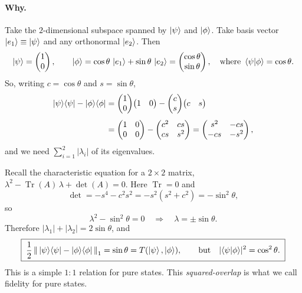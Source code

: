 \documentclass[11pt]{article}
\newcommand{\Tr}{\operatorname{Tr}}
\newcommand{\onenorm}[1]{\left\lVert #1 \right\rVert_{1}}
\begin{document}
\paragraph{Why.}
Take the $2$-dimensional subspace spanned by $\ket{\psi}$ and $\ket{\phi}$.
Take basis vector $\ket{e_1}\equiv\ket{\psi}$ and any orthonormal $\ket{e_2}$.
Then
\[
\ket{\psi} = \begin{pmatrix}1\\0\end{pmatrix},
\qquad
\ket{\phi} = \cos\theta\,\ket{e_1} + \sin\theta\,\ket{e_2}
= \begin{pmatrix}\cos\theta\\ \sin\theta\end{pmatrix},
\quad\text{where } \braket{\psi|\phi} = \cos\theta.
\]
So, writing $c=\cos\theta$ and $s=\sin\theta$,
\begin{align*}
\ket{\psi}\!\bra{\psi} - \ket{\phi}\!\bra{\phi}
&= \begin{pmatrix}1\\0\end{pmatrix}\!\begin{pmatrix}1&0\end{pmatrix}
- \begin{pmatrix}c\\s\end{pmatrix}\!\begin{pmatrix}c&s\end{pmatrix}\\[4pt]
&= \begin{pmatrix}1&0\\0&0\end{pmatrix}
- \begin{pmatrix}c^{2}&cs\\ cs&s^{2}\end{pmatrix}
= \begin{pmatrix}s^{2}&-cs\\ -cs&-s^{2}\end{pmatrix},
\end{align*}
and we need $\sum_{i=1}^{2}|\lambda_i|$ of its eigenvalues.

Recall the characteristic equation for a $2\times 2$ matrix,
$\lambda^{2} - \Tr(A)\,\lambda + \det(A) = 0$. Here $\Tr = 0$ and
\[
\det = -s^{4} - c^{2}s^{2} = -s^{2}(s^{2}+c^{2}) = -\sin^{2}\theta,
\]
so
\[
\lambda^{2} - \sin^{2}\theta = 0
\quad\Longrightarrow\quad
\lambda = \pm\sin\theta.
\]
Therefore $|\lambda_1| + |\lambda_2| = 2\sin\theta$, and
\[
\boxed{\;
\frac12\onenorm{\,\ket{\psi}\!\bra{\psi} - \ket{\phi}\!\bra{\phi}\,}
= \sin\theta = T(\ket{\psi},\ket{\phi}),
\qquad
\text{but}\quad |\!\braket{\psi|\phi}\!|^{2} = \cos^{2}\theta.
\;}
\]
This is a simple $1{:}1$ relation for pure states. This
\emph{squared-overlap} is what we call fidelity for pure states.
\end{document}
